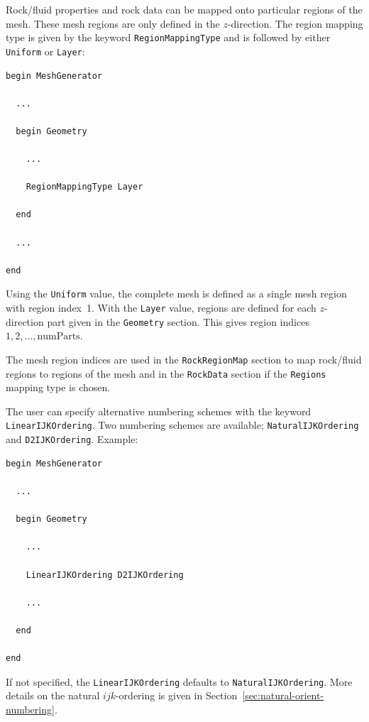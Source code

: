 Rock/fluid properties and rock data can be mapped onto particular
regions of the mesh. These mesh regions are only defined in the
$z$-direction. The region mapping type is given by the keyword
\texttt{RegionMappingType} and is followed by either \texttt{Uniform} or
\texttt{Layer}:
%
\begin{verbatim}
begin MeshGenerator

  ... 

  begin Geometry

    ... 

    RegionMappingType Layer

  end

  ... 

end
\end{verbatim}
%
Using the \texttt{Uniform} value, the complete mesh is defined as a
single mesh region with region index~1. With the \texttt{Layer} value,
regions are defined for each $z$-direction part given in the
\texttt{Geometry} section. This gives region indices $1, 2, \ldots,
\text{numParts}$.

The mesh region indices are used in the \texttt{RockRegionMap} section
to map rock/fluid regions to regions of the mesh and in the
\texttt{RockData} section if the \texttt{Regions} mapping type is
chosen. 

\label{sec:numbering-schemes}

The user can specify alternative numbering schemes with the keyword
\texttt{LinearIJKOrdering}. Two numbering schemes are available;
\texttt{NaturalIJKOrdering} and \texttt{D2IJKOrdering}. Example:
%
\begin{verbatim}
begin MeshGenerator

  ... 

  begin Geometry

    ... 

    LinearIJKOrdering D2IJKOrdering

    ... 

  end

end
\end{verbatim}
%
If not specified, the \texttt{LinearIJKOrdering} defaults to
\texttt{NaturalIJKOrdering}. More details on the natural
$ijk$-ordering is given in Section~\ref{sec:natural-orient-numbering}.

\label{sec:transformations}

